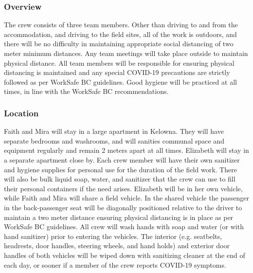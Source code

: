 \documentclass[11pt,letter]{article}
\begin{document}
\subsubsection{Overview}
The crew consists of three team members. Other than driving to and from the accommodation, and driving to the field sites, all of the work is outdoors, and there will be no difficulty in maintaining appropriate social distancing of two meter minimum distances. Any team meetings will take place outside to maintain physical distance. All team members will be responsible for ensuring physical distancing is maintained and any special COVID-19 precautions are strictly followed as per WorkSafe BC guidelines. Good hygiene will be practiced at all times, in line with the  WorkSafe BC recommendations.    

\subsubsection{Location}
Faith and Mira will stay in a large apartment in Kelowna. They will have separate bedrooms and washrooms, and will sanities communal space and equipment regularly and remain 2 meters apart at all times. Elizabeth will stay in a separate apartment close by. Each crew member will have their own sanitizer and hygiene supplies for personal use for the duration of the field work. There will also be bulk liquid soap, water, and sanitizer that the crew can use to fill their personal containers if the need arises. Elizabeth will be in her own vehicle, while Faith and Mira will share a field vehicle. In the shared vehicle the passenger in the back-passenger seat will be diagonally positioned relative to the driver to maintain a two meter distance ensuring physical distancing is in place as per WorkSafe BC guidelines. All crew will wash hands with soap and water (or with hand sanitizer) prior to entering the vehicles. The interior (e.g. seatbelts, headrests, door handles, steering wheels, and hand holds) and exterior door handles of both vehicles will be wiped down with sanitizing cleaner at the end of each day, or sooner if a member of the crew reports COVID-19 symptoms.  
\end{document}
